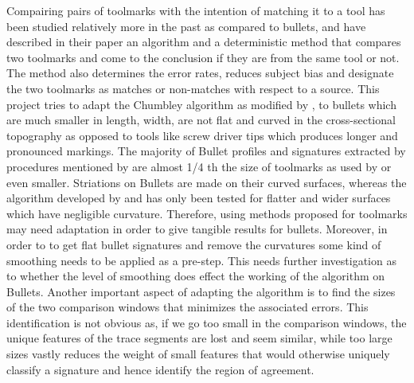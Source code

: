 \documentclass[12pt]{article}
\begin{document}
Compairing pairs of toolmarks with the intention of matching it to a
tool has been studied relatively more in the past as compared to
bullets, and \citet{chumbley} have described in their paper an algorithm
and a deterministic method that compares two toolmarks and come to the
conclusion if they are from the same tool or not. The method also
determines the error rates, reduces subject bias and designate the two
toolmarks as matches or non-matches with respect to a source. This
project tries to adapt the Chumbley algorithm as modified by
\citet{hadler}, to bullets which are much smaller in length, width, are
not flat and curved in the cross-sectional topography as opposed to
tools like screw driver tips which produces longer and pronounced
markings. The majority of Bullet profiles and signatures extracted by
procedures mentioned by \citet{aoas} are almost 1/4 th the size of
toolmarks as used by \citet{chumbley} or even smaller. Striations on
Bullets are made on their curved surfaces, whereas the algorithm
developed by \citet{chumbley} and \citet{hadler} has only been tested
for flatter and wider surfaces which have negligible curvature.
Therefore, using methods proposed for toolmarks may need adaptation in
order to give tangible results for bullets. Moreover, in order to to get
flat bullet signatures and remove the curvatures some kind of smoothing
needs to be applied as a pre-step. This needs further investigation as
to whether the level of smoothing does effect the working of the
algorithm on Bullets. Another important aspect of adapting the algorithm
is to find the sizes of the two comparison windows \citet{hadler} that
minimizes the associated errors. This identification is not obvious as,
if we go too small in the comparison windows, the unique features of the
trace segments are lost and seem similar, while too large sizes vastly
reduces the weight of small features that would otherwise uniquely
classify a signature and hence identify the region of agreement.
\end{document}
